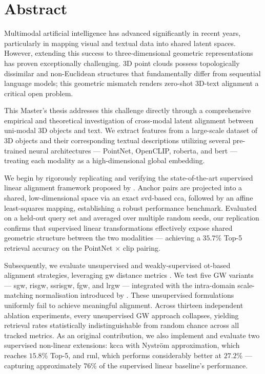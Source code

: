 \cleardoublepage
{}
{}

\chapter*{Abstract}

\begingroup
\setlength{\parindent}{0pt}
\setlength{\parskip}{0.8em}

Multimodal artificial intelligence has advanced significantly in recent years, particularly in mapping visual and textual data into shared latent spaces. However, extending this success to three-dimensional geometric representations has proven exceptionally challenging. 3D point clouds possess topologically dissimilar and non-Euclidean structures that fundamentally differ from sequential language models; this geometric mismatch renders zero-shot 3D-text alignment a critical open problem.

This Master's thesis addresses this challenge directly through a comprehensive empirical and theoretical investigation of cross-modal latent alignment between uni-modal 3D objects and text. We extract features from a large-scale dataset of 3D objects and their corresponding textual descriptions utilizing several pre-trained neural architectures --- PointNet, OpenCLIP, \gls{roberta}, and \gls{bert} --- treating each modality as a high-dimensional global embedding.

We begin by rigorously replicating and verifying the state-of-the-art supervised linear alignment framework proposed by \textcite{hadgi2025escaping}. Anchor pairs are projected into a shared, low-dimensional space via an exact \gls{svd}-based \gls{cca}, followed by an affine least-squares mapping, establishing a robust performance benchmark. Evaluated on a held-out query set and averaged over multiple random seeds, our replication confirms that supervised linear transformations effectively expose shared geometric structure between the two modalities --- achieving a $35.7\%$ Top-5 retrieval accuracy on the PointNet $\times$ \gls{clip} pairing.

Subsequently, we evaluate unsupervised and weakly-supervised \gls{ot}-based alignment strategies, leveraging \gls{gw} distance metrics \cite{vayer2019optimal}. We test five GW variants --- \gls{sgw}, \gls{risgw}, \gls{ssrisgw}, \gls{fgw}, and \gls{lrgw} --- integrated with the intra-domain scale-matching normalisation introduced by \textcite{li2026scale}. These unsupervised formulations uniformly fail to achieve meaningful alignment. Across thirteen independent ablation experiments, every unsupervised GW approach collapses, yielding retrieval rates statistically indistinguishable from random chance across all tracked metrics. As an original contribution, we also implement and evaluate two supervised non-linear extensions: \gls{kcca} with Nystr\"{o}m approximation, which reaches $15.8\%$ Top-5, and \gls{rml}, which performs considerably better at $27.2\%$ --- capturing approximately 76\% of the supervised linear baseline's performance.

